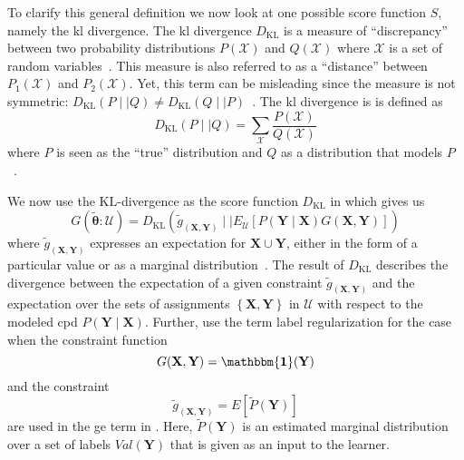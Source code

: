 To clarify this general definition we now look at one possible score function $S$, namely the \acrfull{kl} divergence.
The \gls{kl} divergence $D_{\text{KL}}$ is a measure of ``discrepancy'' between two probability distributions $P(\mathcal{X})$ and $Q(\mathcal{X})$ where $\mathcal{X}$ is a set of \glspl{random variable}~\citep{burnham2003model}.
This measure is also referred to as a ``distance'' between $P_1(\mathcal{X})$ and $P_2(\mathcal{X})$.
Yet, this term can be misleading since the measure is not symmetric: $D_{\text{KL}}(P\mid\mid Q)\neq D_{\text{KL}}(Q\mid\mid P)$~\citep{burnham2003model}.
The \gls{kl} divergence is is defined as~\citep{mackay2003information}
\begin{equation}
  \label{equ:kl-divergence}
  D_{\text{KL}}(P\mid\mid Q)=\sum_\mathcal{X} \frac{P(\mathcal{X})}{Q(\mathcal{X})}
\end{equation}
where $P$ is seen as the ``true'' distribution and $Q$ as a distribution that models $P$~\citep{burnham2003model}.

\bigskip

We now use the $\text{KL}$-divergence as the score function $D_{\text{KL}}$ in  which gives us~\citep{mann2010generalized}
\begin{equation}
  \label{equ:generalized-expectation-kl}
  G(\bm{\tilde{\theta}}:\mathcal{U})=D_{\text{KL}}\left(\tilde{g}_{\left(\mathbf{X},\mathbf{Y}\right)}\mid\mid E_{\mathcal{U}}\left[P(\mathbf{Y}\mid\mathbf{X})G(\mathbf{X},\mathbf{Y})\right]\right)
\end{equation}
where $\tilde{g}_{\left(\mathbf{X},\mathbf{Y}\right)}$ expresses an expectation for $\mathbf{X}\cup\mathbf{Y}$, either in the form of a particular value or as a \gls{marginal distribution}~\citep{mann2010generalized}.
The result of $D_{\text{KL}}$ describes the divergence between the expectation of a given constraint $\tilde{g}_{\left(\mathbf{X},\mathbf{Y}\right)}$ and the expectation over the sets of assignments $\left\{\mathbf{X},\mathbf{Y}\right\}$ in $\mathcal{U}$ with respect to the modeled \gls{cpd} $P(\mathbf{Y}\mid\mathbf{X})$.
Further, \citet{mann2010generalized} use the term \gls{label regularization} for the case when the constraint function
\begin{equation}
  \label{equ:label-regularization-constraint-function}
  G(\mathbf{X},\mathbf{Y})=\mathbf{\mathbbm{1}}(\mathbf{Y})
\end{equation}
and the constraint
\begin{equation}
  \label{equ:label-regularization-constraints}
  \tilde{g}_{\left(\mathbf{X},\mathbf{Y}\right)}=E[\tilde{P}(\mathbf{Y})]
\end{equation}
are used in the \gls{ge} term in .
Here, $\tilde{P}(\mathbf{Y})$ is an estimated \gls{marginal distribution} over a set of labels $Val(\mathbf{Y})$ that is given as an input to the learner.

